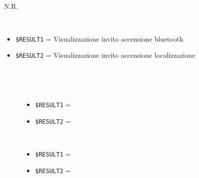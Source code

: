 \documentclass[../../Sperimentazione.tex]{subfiles}
\begin{document}
			\begin{tcolorbox}[fonttitle=\bfseries, 
								adjusted title={\Large Prova 8A.1}, 
								breakable, 
								sharp corners=south,
								colback=white, 
								colframe=white!60!black]
								
				\begin{description}[leftmargin=0.7cm,labelwidth=!]
				
					\item[Input] \ \par 
        				N.R.
        				
        			\tcbline 
        				
        			\item[Output atteso] \ \par
        				\begin{itemize}
        					\item \verb|$RESULT1| = Visualizzazione invito accensione bluetooth
        					\item \verb|$RESULT2| = Visualizzazione invito accensione localizzazione
        				\end{itemize}

					\tcbline        				
        				
        			\item[Output riscontrato] \ \par
        				\begin{description}
        				
        					\item[\dispositivoA] \ \par
        					\begin{itemize}
        						\item \verb|$RESULT1| = \ok
        						\item \verb|$RESULT2| = \ok
        					\end{itemize}      					
        					
        					\item[\dispositivoB] \ \par
        					\begin{itemize}
        						\item \verb|$RESULT1| = \ok
        						\item \verb|$RESULT2| = \ok
        					\end{itemize}
        					
        				\end{description}
        				
				\end{description}  
				
			\end{tcolorbox}
\end{document}

